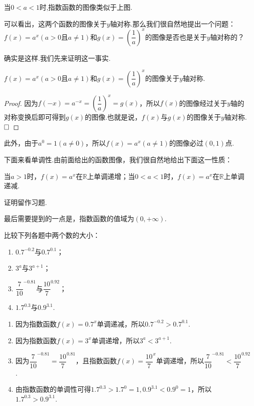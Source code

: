 \documentclass[lang=cn,math=cm,chinesefont=nofont,11pt,scheme=chinese,twocol]{elegantbook}
\begin{document}
当$0<a<1$时,指数函数的图像类似于上图.

可以看出，这两个函数的图像关于$y$轴对称.那么我们很自然地提出一个问题：$f(x)=a^x(a>0\text{且}a\neq 1)$和$g(x)=(\dfrac{1}{a})^x$的图像是否也是关于$y$轴对称的？

确实是这样.我们先来证明这一事实.

\begin{property}
  $f(x)=a^x(a>0\text{且}a\neq 1)$和$g(x)=(\dfrac{1}{a})^x$的图像关于$y$轴对称.
\end{property}

\begin{proof}
  因为$f(-x)=a^{-x}=(\dfrac{1}{a})^x=g(x)$，所以$f(x)$的图像经过关于$y$轴的对称变换后即可得到$g(x)$的图像.也就是说，$f(x)$与$g(x)$的图像关于$y$轴对称.$\hfill\square$
\end{proof}

此外，由于$a^0=1(a\neq 0)$，所以$f(x)=a^x(a\neq 1)$的图像必过$(0,1)$点.

下面来看单调性.由前面给出的函数图像，我们很自然地给出下面这一性质：

\begin{property}
  当$a>1$时，$f(x)=a^x$在$\mathbb{R}$上单调递增；当$0<a<1$时，$f(x)=a^x$在$\mathbb{R}$上单调递减.
\end{property}

证明留作习题.

最后需要提到的一点是，指数函数的值域为$(0,+\infty)$.

\begin{example}
  比较下列各题中两个数的大小：
\end{example}

\begin{enumerate}
  \item $0.7^{-0.2}$与$0.7^{0.1}$；
  \item $3^a$与$3^{a+1}$；
  \item $\dfrac{7}{10}^{-0.81}$与$\dfrac{10}{7}^{0.92}$；
  \item $1.7^{0.3}$与$0.9^{3.1}$.
\end{enumerate}

\begin{solution}
  \begin{enumerate}
    \item 因为指数函数$f(x)=0.7^x$单调递减，所以$0.7^{-0.2}>0.7^{0.1}$.
    \item 因为指数函数$f(x)=3^x$单调递增，所以$3^a<3^{a+1}$.
    \item 因为$\dfrac{7}{10}^{-0.81}=\dfrac{10}{7}^{0.81}$，且指数函数$f(x)=\dfrac{10}{7}^x$单调递增，所以$\dfrac{7}{10}^{-0.81}<\dfrac{10}{7}^{0.92}$.
    \item 由指数函数的单调性可得$1.7^{0.3}>1.7^0=1,0.9^{3.1}<0.9^0=1$，所以$1.7^{0.3}>0.9^{3.1}$.
  \end{enumerate}
\end{solution}
\end{document}
